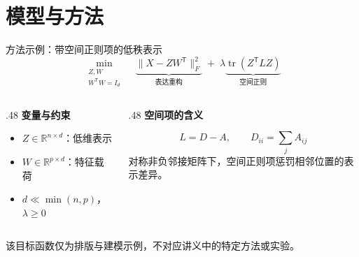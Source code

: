 \documentclass[aspectratio=169,11pt]{beamer}
\newcommand{\smallnote}[1]{\par{\scriptsize\color{Muted}#1\par}}
\newcommand{\labeltext}[1]{{\color{Teal}\bfseries #1}\par}
\newcommand{\spaceditem}{\setlength{\itemsep}{0.8em}}
\begin{document}
\section{模型与方法}
\begin{frame}{方法示例：带空间正则项的低秩表示}
  \vspace{1mm}
  \[
    \min_{\substack{Z,W\\W^{\mathsf T}W=I_d}}\quad
    \underbrace{\lVert X-ZW^{\mathsf T}\rVert_F^2}_{\text{表达重构}}
    \;+\;
    \lambda\underbrace{\operatorname{tr}(Z^{\mathsf T}LZ)}_{\text{空间正则}}
  \]
  \vspace{5mm}
  \begin{columns}[T,onlytextwidth]
    \begin{column}{.48\textwidth}
      \labeltext{变量与约束}
      \begin{itemize}\spaceditem
        \item $Z\in\mathbb{R}^{n\times d}$：低维表示
        \item $W\in\mathbb{R}^{p\times d}$：特征载荷
        \item $d\ll \min(n,p)$，$\lambda\geq 0$
      \end{itemize}
    \end{column}
    \begin{column}{.48\textwidth}
      \labeltext{空间项的含义}
      \[
        L=D-A,\qquad D_{ii}=\sum_j A_{ij}
      \]
      \small 对称非负邻接矩阵下，空间正则项惩罚相邻位置的表示差异。
    \end{column}
  \end{columns}
  \vfill
  \smallnote{该目标函数仅为排版与建模示例，不对应讲义中的特定方法或实验。}
\end{frame}

\end{document}
